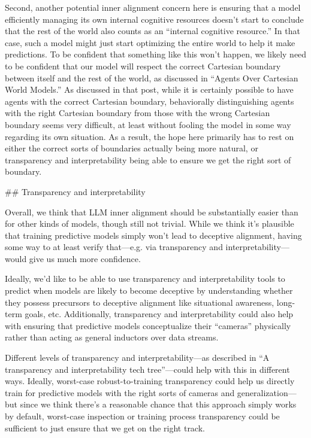 {Second, another potential inner alignment concern here is ensuring that a model efficiently managing its own internal cognitive resources doesn't start to conclude that the rest of the world also counts as an ``internal cognitive resource.'' In that case, such a model might just start optimizing the entire world to help it make predictions. To be confident that something like this won't happen, we likely need to be confident that our model will respect the correct Cartesian boundary between itself and the rest of the world, as discussed in ``Agents Over Cartesian World Models\cite{TODO: cite https://www.alignmentforum.org/posts/LBNjeGaJZw7QdybMw/agents-over-cartesian-world-models}.'' As discussed in that post, while it is certainly possible to have agents with the correct Cartesian boundary, behaviorally distinguishing agents with the right Cartesian boundary from those with the wrong Cartesian boundary seems very difficult, at least without fooling the model in some way regarding its own situation. As a result, the hope here primarily has to rest on either the correct sorts of boundaries actually being more natural, or transparency and interpretability being able to ensure we get the right sort of boundary.


## Transparency and interpretability

Overall, we think that LLM inner alignment should be substantially easier than for other kinds of models, though still not trivial. While we think it's plausible that training predictive models simply won't lead to deceptive alignment, having some way to at least verify that---e.g. via transparency and interpretability---would give us much more confidence.

Ideally, we'd like to be able to use transparency and interpretability tools to predict when models are likely to become deceptive by understanding whether they possess precursors to deceptive alignment like situational awareness, long-term goals, etc. Additionally, transparency and interpretability could also help with ensuring that predictive models conceptualize their ``cameras'' physically rather than acting as general inductors over data streams.

Different levels of transparency and interpretability---as described in ``A transparency and interpretability tech tree\cite{TODO: cite https://www.alignmentforum.org/posts/nbq2bWLcYmSGup9aF/a-transparency-and-interpretability-tech-tree}''---could help with this in different ways. Ideally, worst-case robust-to-training transparency could help us directly train for predictive models with the right sorts of cameras and generalization---but since we think there's a reasonable chance that this approach simply works by default, worst-case inspection or training process transparency could be sufficient to just ensure that we get on the right track.

}
